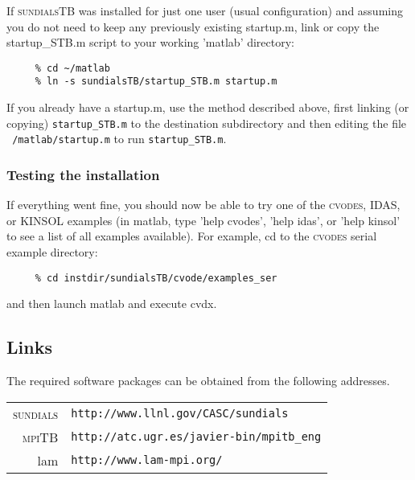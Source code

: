 \documentclass[titlepage,10pt]{article}
\newcommand{\sundialsTB}{{\normalfont\scshape sundialsTB}}
\newcommand{\sundials}{{\normalfont\scshape sundials}}
\newcommand{\cvodes}{{\normalfont\scshape cvodes}}
\newcommand{\mpiTB}{{\normalfont\scshape mpiTB}}
\begin{document}
If {\sundialsTB} was installed for just one user (usual configuration) and
assuming you do not need to keep any previously existing startup.m, link 
or copy the startup\_STB.m script to your working 'matlab' directory:

\begin{verbatim}
     % cd ~/matlab
     % ln -s sundialsTB/startup_STB.m startup.m
\end{verbatim}

If you already have a startup.m, use the method described above, first linking 
(or copying) {\tt startup\_STB.m} to the destination subdirectory and then editing 
the file {\tt ~/matlab/startup.m} to run {\tt startup\_STB.m}.

\subsubsection{Testing the installation}

If everything went fine, you should now be able to try one of the {\cvodes}, IDAS,
or KINSOL examples (in matlab, type 'help cvodes', 'help idas', or 'help kinsol' 
to see a list of all examples available). For example, cd to the {\cvodes} serial 
example directory:
\begin{verbatim}
     % cd instdir/sundialsTB/cvode/examples_ser
\end{verbatim}
and then launch matlab and execute cvdx.


\subsection{Links} 

The required software packages can be obtained from the following addresses.

\begin{tabular}{rl}
{\sundials} & {\tt http://www.llnl.gov/CASC/sundials} \\
{\mpiTB}    & {\tt http://atc.ugr.es/javier-bin/mpitb\_eng}\\
{\sc lam}   & {\tt http://www.lam-mpi.org/}
\end{tabular}
\end{document}
